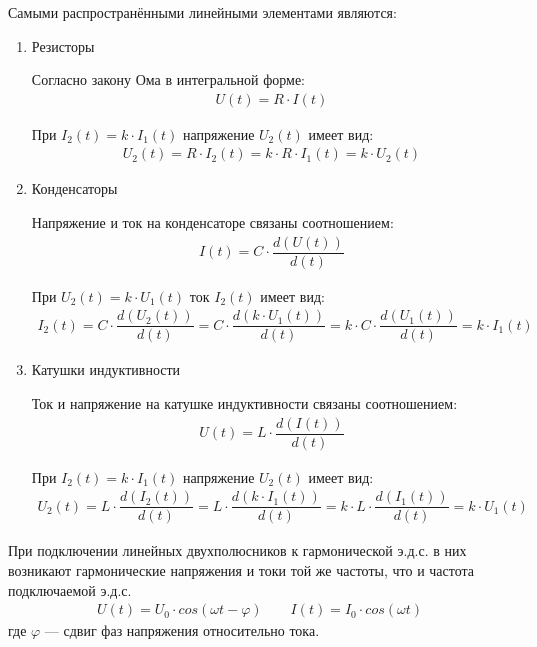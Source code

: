 \documentclass[a4paper, usenames, dvipsnames]{article}
\begin{document}
Самыми распространёнными линейными элементами являются:
\begin{enumerate}
    \item Резисторы

          Согласно закону Ома в интегральной форме:
          \begin{gather*}
              U(t) = R \cdot I(t)
          \end{gather*}

          При $I_2(t) = k \cdot I_1(t)$ напряжение $U_2(t)$ имеет вид:
          \begin{gather*}
              U_2(t) = R \cdot I_2(t) = k \cdot R \cdot I_1(t) = k \cdot U_2(t)
          \end{gather*}
    \item Конденсаторы

          Напряжение и ток на конденсаторе связаны соотношением:
          \begin{gather*}
              I(t) = C \cdot \dfrac{d(U(t))}{d(t)}
          \end{gather*}

          При $U_2(t) = k \cdot U_1(t)$ ток $I_2(t)$ имеет вид:
          \begin{gather*}
              I_2(t) = C \cdot \dfrac{d(U_2(t))}{d(t)} = C \cdot \dfrac{d(k \cdot U_1(t))}{d(t)} = k \cdot C \cdot \dfrac{d(U_1(t))}{d(t)} = k \cdot I_1(t)
          \end{gather*}

    \item Катушки индуктивности

          Ток и напряжение на катушке индуктивности связаны соотношением:
          \begin{gather*}
              U(t) = L \cdot \dfrac{d(I(t))}{d(t)}
          \end{gather*}

          При $I_2(t) = k \cdot I_1(t)$ напряжение $U_2(t)$ имеет вид:
          \begin{gather*}
              U_2(t) = L \cdot \dfrac{d(I_2(t))}{d(t)} = L \cdot \dfrac{d(k \cdot I_1(t))}{d(t)} = k \cdot L \cdot \dfrac{d(I_1(t))}{d(t)} = k \cdot U_1(t)
          \end{gather*}
\end{enumerate}

При подключении линейных двухполюсников к гармонической э.д.с.
в них возникают гармонические напряжения и токи той же частоты, что
и частота подключаемой э.д.с.
\begin{gather*}
    U(t) = U_0 \cdot cos(\omega t - \varphi) \hspace{2em} I(t) = I_0 \cdot cos(\omega t)
\end{gather*}
где $\varphi$ --- сдвиг фаз напряжения относительно тока.
\end{document}
